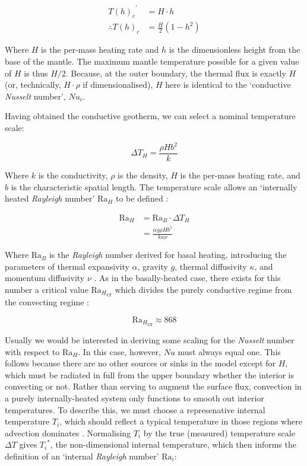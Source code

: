 \documentclass[a4paper,11pt,oneside]{book}
\begin{document}
\begin{align*}
{{T(h)}_{c}}^{'} &= H\cdot h \\
\therefore {T(h)}_{c} &= \frac{H}{2} \left( 1 - h^2 \right)
\end{align*}

Where $H$ is the per-mass heating rate and $h$ is the dimensionless height from the base of the mantle. The maximum mantle temperature possible for a given value of $H$ is thus $H/2$. Because, at the outer boundary, the thermal flux is exactly $H$ (or, technically, $H \cdot \rho$ if dimensionalised), $H$ here is identical to the `conductive \textit{Nusselt} number', ${Nu}_{c}$.

Having obtained the conductive geotherm, we can select a nominal temperature scale:

\begin{equation}
{\Delta T}_H = \frac{\rho H b^2}{k}
\end{equation}

Where $k$ is the conductivity, $\rho$ is the density, $H$ is the per-mass heating rate, and $b$ is the characteristic spatial length. The temperature scale allows an `internally heated \textit{Rayleigh} number' ${\mathrm{Ra}}_H$ to be defined \cite{Roberts1967-aq}:

\begin{align*}
{\mathrm{Ra}}_H &= {\mathrm{Ra}}_B \cdot {\Delta T}_H \\
&= \frac{\alpha g \rho H b^5}{k \kappa \nu}
\end{align*}

Where ${\mathrm{Ra}}_B$ is the \textit{Rayleigh} number derived for basal heating, introducing the parameters of thermal expansivity $\alpha$, gravity $g$, thermal diffusivity $\kappa$, and momentum diffusivity $\nu$ \cite{Turcotte2014-by}. As in the basally-heated case, there exists for this number a critical value ${{\mathrm{Ra}}_{H}}_{\mathrm{cr}}$ which divides the purely conductive regime from the convecting regime \cite{Roberts1967-aq}:

\begin{equation}
{{\mathrm{Ra}}_{H}}_{\mathrm{cr}} \approx 868
\end{equation}

Usually we would be interested in deriving some scaling for the \textit{Nusselt} number with respect to ${\mathrm{Ra}}_H$. In this case, however, $Nu$ must always equal one. This follows because there are no other sources or sinks in the model except for $H$, which must be radiated in full from the upper boundary whether the interior is convecting or not. Rather than serving to augment the surface flux, convection in a purely internally-heated system only functions to smooth out interior temperatures. To describe this, we must choose a represenative internal temperature $T_{i}$, which should reflect a typical temperature in those regions where advection dominates \cite{Solomatov2000-xn}. Normalising $T_{i}$ by the true (measured) temperature scale $\Delta T$ gives ${T_{i}}^{*}$, the non-dimensional internal temperature, which then informs the definition of an `internal \textit{Rayleigh} number' ${\mathrm{Ra}}_i$:
\end{document}
